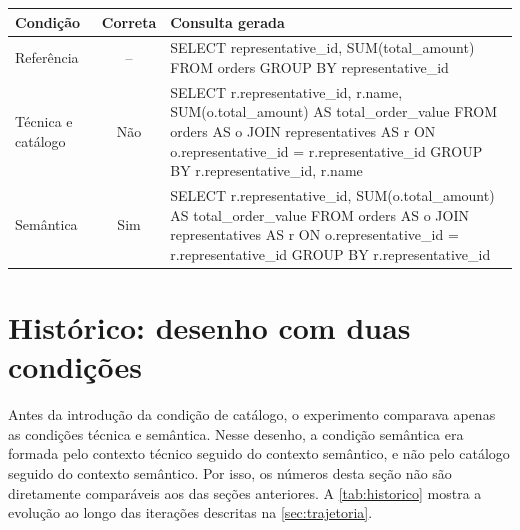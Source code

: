 \begin{quadro}[htb]
  \centering
  \caption{Q038: ``Qual é o valor total de pedidos por representante?''}
  \label{qua:ex-q038}
  \footnotesize
  \begin{tabularx}{\textwidth}{|l|c|X|}
    \hline
    \textbf{Condição} & \textbf{Correta} & \textbf{Consulta gerada} \\ \hline
    Referência & -- & \ttfamily SELECT representative\_id, SUM(total\_amount)
      FROM orders GROUP BY representative\_id \\ \hline
    Técnica e catálogo & Não & \ttfamily SELECT r.representative\_id, r.name,
      SUM(o.total\_amount) AS total\_order\_value FROM orders AS o JOIN
      representatives AS r ON o.representative\_id = r.representative\_id
      GROUP BY r.representative\_id, r.name \\ \hline
    Semântica & Sim & \ttfamily SELECT r.representative\_id,
      SUM(o.total\_amount) AS total\_order\_value FROM orders AS o JOIN
      representatives AS r ON o.representative\_id = r.representative\_id
      GROUP BY r.representative\_id \\ \hline
  \end{tabularx}
\end{quadro}

\section{Histórico: desenho com duas condições}
\label{sec:historico}

Antes da introdução da condição de catálogo, o experimento comparava apenas
as condições técnica e semântica. Nesse desenho, a condição semântica era
formada pelo contexto técnico seguido do contexto semântico, e não pelo
catálogo seguido do contexto semântico. Por isso, os números desta seção
não são diretamente comparáveis aos das seções anteriores. A
\autoref{tab:historico} mostra a evolução ao longo das iterações descritas
na \autoref{sec:trajetoria}.

